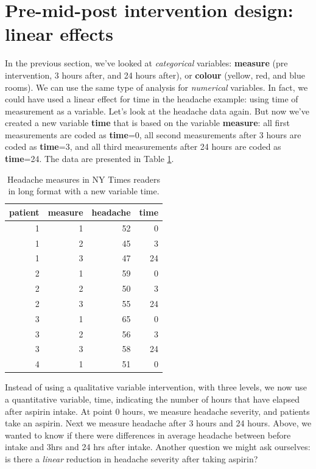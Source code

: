 \documentclass[]{report}\usepackage[]{graphicx}\usepackage[]{color}
\begin{document}
\section{Pre-mid-post intervention design: linear effects}
In the previous section, we've looked at \textit{categorical} variables: \textbf{measure} (pre intervention, 3 hours after, and 24 hours after), or \textbf{colour} (yellow, red, and blue rooms). We can use the same type of analysis for \textit{numerical} variables. In fact, we could have used a linear effect for time in the headache example: using time of measurement as a variable. Let's look at the headache data again. But now we've created a new variable \textbf{time} that is based on the variable \textbf{measure}: all first measurements are coded as \textbf{time}=0, all second measurements after 3 hours are coded as \textbf{time}=3, and all third measurements after 24 hours are coded as \textbf{time}=24. The data are presented in Table \ref{tab:analysispremidpost3}.

\begin{table}[ht]
\centering
\caption{Headache measures in NY Times readers in long format with a new variable time.} 
\label{tab:analysispremidpost3}
\begin{tabular}{rrrr}
  \hline
patient & measure & headache & time \\ 
  \hline
1 & 1 & 52 & 0 \\ 
  1 & 2 & 45 & 3 \\ 
  1 & 3 & 47 & 24 \\ 
  2 & 1 & 59 & 0 \\ 
  2 & 2 & 50 & 3 \\ 
  2 & 3 & 55 & 24 \\ 
  3 & 1 & 65 & 0 \\ 
  3 & 2 & 56 & 3 \\ 
  3 & 3 & 58 & 24 \\ 
  4 & 1 & 51 & 0 \\ 
   \hline
\end{tabular}
\end{table}

 
 
Instead of using a qualitative variable intervention, with three levels, we now use a quantitative variable, time, indicating the number of hours that have elapsed after aspirin intake. At point 0 hours, we measure headache severity, and patients take an aspirin. Next we measure headache after 3 hours and 24 hours. Above, we wanted to know if there were differences in average headache between before intake and 3hrs and 24 hrs after intake. Another question we might ask ourselves: is there a \textit{linear} reduction in headache severity after taking aspirin?
\end{document}
